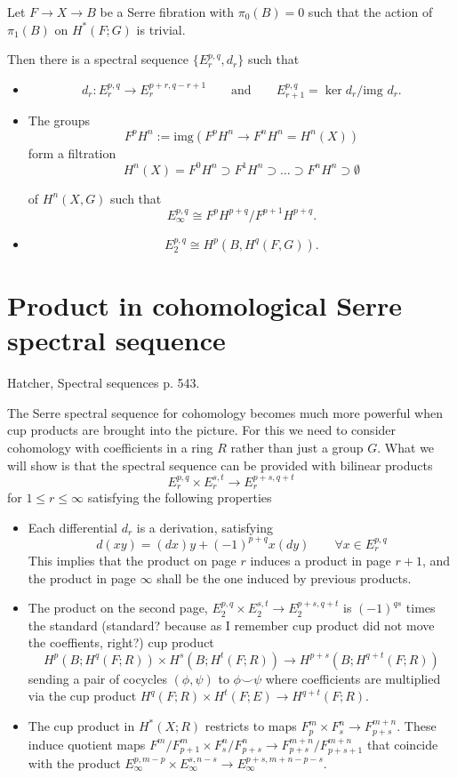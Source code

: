 \begin{theorem}
\label{theorem-serre-spect-seque-cohom}
	Let $F\to X\to B$ be a Serre fibration with
	$\pi_0(B)=0$ such that the action of
	$\pi_1(B)$ on $H^*(F;G)$ is trivial.

	Then there is a spectral sequence
	$\{E_r^{p,q},d_r\}$ such that
\begin{itemize}
	\item $$d_r:E_r^{p,q}\to
	E_r^{p+r,q-r+1}\qquad\text{and} \qquad
	E_{r+1}^{p,q}=\ker d_r/\text{img }d_r.$$
	\item The groups
		$$F^pH^n:=\text{img} (F^pH^n\to
		F^nH^n=H^n(X))$$
	form a filtration
	$$H^{n}(X)=F^0H^n\supset F^1H^n\supset
	\ldots\supset F^nH^n\supset \emptyset $$

	of $H^{n}(X,G)$ such that
	$$E_{\infty}^{p,q}\cong
	F^pH^{p+q}/F^{p+1}H^{p+q}.$$
\item $$E^{p,q}_2\cong H^p(B,H^{q}(F,G)).$$
\end{itemize}
\end{theorem}

\section{Product in cohomological Serre
spectral sequence}
\label{section-produ-cohom-serre-spect}
Hatcher, Spectral sequences p. 543.

The Serre spectral sequence for cohomology
becomes much more powerful when cup products
are brought into the picture. For this we
need to consider cohomology with coefficients
in a ring $R$ rather than just a group $G$.
What we will show is that the spectral
sequence can be provided with bilinear
products
$$E^{p,q}_{r}\times E^{s,t}_{r}\to
E^{p+s,q+t}_{r}$$
for $1\leq r\leq \infty$ satisfying the
following properties
\begin{itemize}
	\item Each differential $d_{r}$ is a
	derivation, satisfying
		$$d(xy)=(dx)y+(-1)^{p+q} x(dy)\qquad
		\forall x\in E^{p,q}_{r}$$
	This implies that the product on page $r$
	induces a product in page $r+1$, and the
	product in page $\infty$ shall be the one
	induced by previous products.
	\item The product on the second page,
	$E^{p,q}_{2}\times E^{s,t}_{2}\to
	E^{p+s,q+t}_{2}$ is $(-1)^{qs}$ times the
	standard (standard? because as I remember
	cup product did not move the coeffients,
	right?) cup product
		$$H^{p}(B;H^{q}(F;R))\times
		H^{s}(B;H^{t}(F;R))\to
		H^{p+s}(B;H^{q+t}(F;R))$$
		sending a pair of cocycles $(\phi,\psi)$ to
		$\phi\smile \psi$ where coefficients are
		multiplied via the cup product
		$H^{q}(F;R)\times H^{t}(F;E)\to
		H^{q+t}(F;R)$.
	\item The cup product in $H^{*}(X;R)$
	restricts to maps $F^{m}_{p}\times
	F^{n}_{s}\to F^{m+n}_{p+s}$. These induce
	quotient maps $F^{ m}/F^{m}_{p+1}\times
	F^{n}_s/F^{n}_{p+s}\to
	F^{m+n}_{p+s}/F^{m+n}_{p+s+1}$ that coincide
	with the product $E^{p,m-p}_{\infty}\times
	E^{s,n-s}_{\infty}\to
	E^{p+s,m+n-p-s}_{\infty}$.
\end{itemize}

